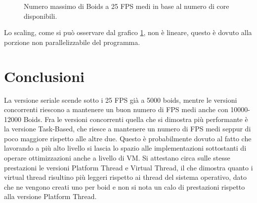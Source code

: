 \documentclass[11pt,notitlepage]{article}
\begin{document}
\begin{figure}[H]
    \centering
    \caption{Numero massimo di Boids a 25 FPS medi in base al numero di core disponibili.}
    \label{fig:scalability-graph}
\end{figure}

Lo scaling, come si può osservare dal grafico \ref{fig:scalability-graph}, non è lineare, questo è dovuto alla porzione non parallelizzabile del programma.

\section{Conclusioni}

La versione seriale scende sotto i 25 FPS già a 5000 boids, mentre le versioni concorrenti riescono a mantenere un buon numero di FPS medi anche con 10000-12000 Boids.
Fra le versioni concorrenti quella che si dimostra più performante è la versione Task-Based, che riesce a mantenere un numero di FPS medi seppur di poco maggiore rispetto alle altre due.
Questo è probabilmente dovuto al fatto che lavorando a più alto livello si lascia lo spazio alle implementazioni sottostanti di operare ottimizzazioni anche a livello di VM.
Si attestano circa sulle stesse prestazioni le versioni Platform Thread e Virtual Thread, il che dimostra quanto i virtual thread risultino più leggeri rispetto ai thread del sistema operativo, dato che ne vengono
creati uno per boid e non si nota un calo di prestazioni rispetto alla versione Platform Thread.
\end{document}

